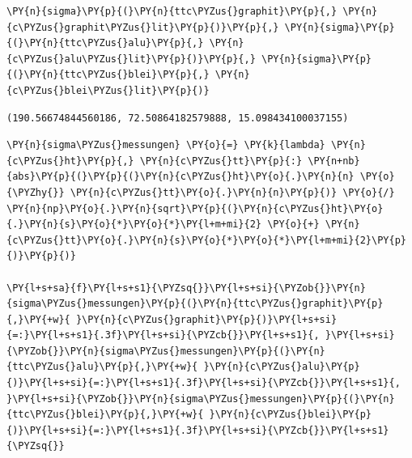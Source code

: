     \begin{tcolorbox}[breakable, size=fbox, boxrule=1pt, pad at break*=1mm,colback=cellbackground, colframe=cellborder]
\begin{Verbatim}[commandchars=\\\{\}]
\PY{n}{sigma}\PY{p}{(}\PY{n}{ttc\PYZus{}graphit}\PY{p}{,} \PY{n}{c\PYZus{}graphit\PYZus{}lit}\PY{p}{)}\PY{p}{,} \PY{n}{sigma}\PY{p}{(}\PY{n}{ttc\PYZus{}alu}\PY{p}{,} \PY{n}{c\PYZus{}alu\PYZus{}lit}\PY{p}{)}\PY{p}{,} \PY{n}{sigma}\PY{p}{(}\PY{n}{ttc\PYZus{}blei}\PY{p}{,} \PY{n}{c\PYZus{}blei\PYZus{}lit}\PY{p}{)}
\end{Verbatim}
\end{tcolorbox}

            \begin{tcolorbox}[breakable, size=fbox, boxrule=.5pt, pad at break*=1mm, opacityfill=0]
\begin{Verbatim}[commandchars=\\\{\}]
(190.56674844560186, 72.50864182579888, 15.098434100037155)
\end{Verbatim}
\end{tcolorbox}
        
    \begin{tcolorbox}[breakable, size=fbox, boxrule=1pt, pad at break*=1mm,colback=cellbackground, colframe=cellborder]
\begin{Verbatim}[commandchars=\\\{\}]
\PY{n}{sigma\PYZus{}messungen} \PY{o}{=} \PY{k}{lambda} \PY{n}{c\PYZus{}ht}\PY{p}{,} \PY{n}{c\PYZus{}tt}\PY{p}{:} \PY{n+nb}{abs}\PY{p}{(}\PY{p}{(}\PY{n}{c\PYZus{}ht}\PY{o}{.}\PY{n}{n} \PY{o}{\PYZhy{}} \PY{n}{c\PYZus{}tt}\PY{o}{.}\PY{n}{n}\PY{p}{)} \PY{o}{/} \PY{n}{np}\PY{o}{.}\PY{n}{sqrt}\PY{p}{(}\PY{n}{c\PYZus{}ht}\PY{o}{.}\PY{n}{s}\PY{o}{*}\PY{o}{*}\PY{l+m+mi}{2} \PY{o}{+} \PY{n}{c\PYZus{}tt}\PY{o}{.}\PY{n}{s}\PY{o}{*}\PY{o}{*}\PY{l+m+mi}{2}\PY{p}{)}\PY{p}{)}

\PY{l+s+sa}{f}\PY{l+s+s1}{\PYZsq{}}\PY{l+s+si}{\PYZob{}}\PY{n}{sigma\PYZus{}messungen}\PY{p}{(}\PY{n}{ttc\PYZus{}graphit}\PY{p}{,}\PY{+w}{ }\PY{n}{c\PYZus{}graphit}\PY{p}{)}\PY{l+s+si}{=:}\PY{l+s+s1}{.3f}\PY{l+s+si}{\PYZcb{}}\PY{l+s+s1}{, }\PY{l+s+si}{\PYZob{}}\PY{n}{sigma\PYZus{}messungen}\PY{p}{(}\PY{n}{ttc\PYZus{}alu}\PY{p}{,}\PY{+w}{ }\PY{n}{c\PYZus{}alu}\PY{p}{)}\PY{l+s+si}{=:}\PY{l+s+s1}{.3f}\PY{l+s+si}{\PYZcb{}}\PY{l+s+s1}{, }\PY{l+s+si}{\PYZob{}}\PY{n}{sigma\PYZus{}messungen}\PY{p}{(}\PY{n}{ttc\PYZus{}blei}\PY{p}{,}\PY{+w}{ }\PY{n}{c\PYZus{}blei}\PY{p}{)}\PY{l+s+si}{=:}\PY{l+s+s1}{.3f}\PY{l+s+si}{\PYZcb{}}\PY{l+s+s1}{\PYZsq{}}
\end{Verbatim}
\end{tcolorbox}

